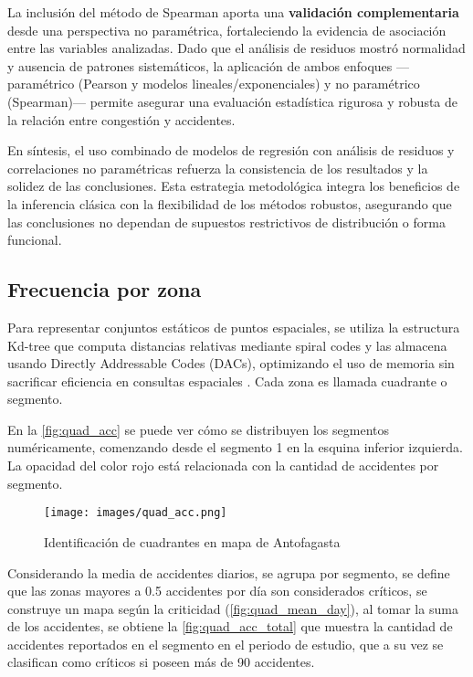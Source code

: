 \documentclass[12pt]{article}
\begin{document}
La inclusión del método de Spearman aporta una \textbf{validación complementaria} desde una perspectiva no paramétrica, fortaleciendo la evidencia de asociación entre las variables analizadas. Dado que el análisis de residuos mostró normalidad y ausencia de patrones sistemáticos, la aplicación de ambos enfoques —paramétrico (Pearson y modelos lineales/exponenciales) y no paramétrico (Spearman)— permite asegurar una evaluación estadística rigurosa y robusta de la relación entre congestión y accidentes.

En síntesis, el uso combinado de modelos de regresión con análisis de residuos y correlaciones no paramétricas refuerza la consistencia de los resultados y la solidez de las conclusiones. Esta estrategia metodológica integra los beneficios de la inferencia clásica con la flexibilidad de los métodos robustos, asegurando que las conclusiones no dependan de supuestos restrictivos de distribución o forma funcional.


\subsection{Frecuencia por zona} \label{ssec:freq_zone}

Para representar conjuntos estáticos de puntos espaciales, se utiliza la estructura Kd-tree que computa distancias relativas mediante spiral codes y las almacena usando Directly Addressable Codes (DACs), optimizando el uso de memoria sin sacrificar eficiencia en consultas espaciales \parencite{gutierrez2023ckdtree}. Cada zona es llamada cuadrante o segmento.

En la \autoref{fig:quad_acc} se puede ver cómo se distribuyen los segmentos numéricamente, comenzando desde el segmento 1 en la esquina inferior izquierda. La opacidad del color rojo está relacionada con la cantidad de accidentes por segmento.

\begin{figure}[H]
    \centering
    \texttt{[image: images/quad\_acc.png]}
    \caption{Identificación de cuadrantes en mapa de Antofagasta}
    \label{fig:quad_acc}
\end{figure}

Considerando la media de accidentes diarios, se agrupa por segmento, se define que las zonas mayores a 0.5 accidentes por día son considerados críticos, se construye un mapa según la criticidad (\autoref{fig:quad_mean_day}), al tomar la suma de los accidentes, se obtiene la \autoref{fig:quad_acc_total} que muestra la cantidad de accidentes reportados en el segmento en el periodo de estudio, que a su vez se clasifican como críticos si poseen más de 90 accidentes.
\end{document}
